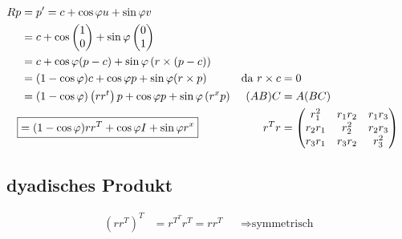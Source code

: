 \begin{align*}
	Rp & = p' = c + \cos \varphi u + \sin \varphi v\\
	& = c + \cos \vektor{1\\0} + \sin \varphi \vektor{0\\1}\\
	& = c + \cos \varphi (p-c) + \sin \varphi \left( r \times (p-c) \right)\\
	& = (1 - \cos \varphi) c + \cos \varphi p + \sin \varphi (r\times p) & \text{da } r\times c & = 0\\
	& = (1 - \cos \varphi) \left( rr^t \right)p + \cos \varphi p + \sin \varphi \left( r^xp \right)&(AB)C &=A(BC)\\
	\Aboxed{&=(1-\cos\varphi) rr^T + \cos \varphi I + \sin\varphi r^x } & r^Tr & = \vektor{r_1^2&r_1r_2&r_1r_3\\r_2r_1&r_2^2&r_2r_3\\r_3r_1&r_3r_2&r_3^2}
\end{align*}
\subsection{dyadisches Produkt}
\begin{align*}
\left( rr^T \right)^T &= r^{T^T}r^T = rr^T&&\Rightarrow \text{symmetrisch}
\end{align*}
